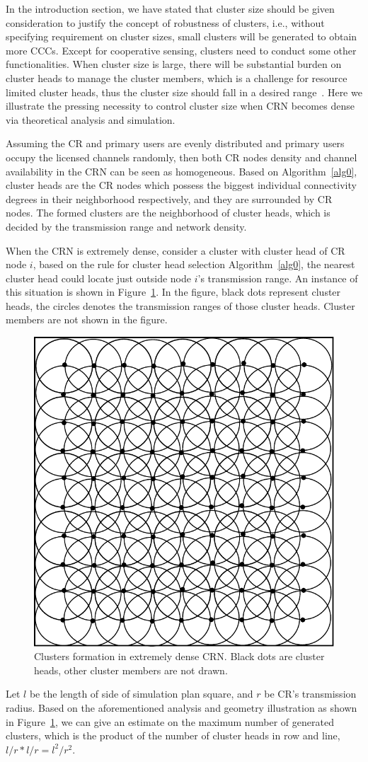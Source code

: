 \documentclass[10pt,journal,compsoc]{IEEEtran}
\theoremstyle{mytheoremstyle}
\theoremstyle{mytheoremstyle}
\theoremstyle{mytheoremstyle}
\newcommand{\ie}{i.e., }
\begin{document}
In the introduction section, we have stated that cluster size should be given consideration to justify the concept of robustness of clusters, \ie without specifying requirement on cluster sizes, small clusters will be generated to obtain more CCCs.
Except for cooperative sensing, clusters need to conduct some other functionalities.
When cluster size is large, there will be substantial burden on cluster heads to manage the cluster members, which is a challenge for resource limited cluster heads, thus the cluster size should fall in a desired range~\cite{Chen04clusteringalgorithms, capacity_cluster_06}.
Here we illustrate the pressing necessity to control cluster size when CRN becomes dense via theoretical analysis and simulation.

Assuming the CR and primary users are evenly distributed and primary users occupy the licensed channels randomly, then both CR nodes density and channel availability in the CRN can be seen as homogeneous.
Based on Algorithm~\ref{alg0}, cluster heads are the CR nodes which possess the biggest individual connectivity degrees in their neighborhood respectively, and they are surrounded by CR nodes.
The formed clusters are the neighborhood of cluster heads, which is decided by the transmission range and network density.

When the CRN is extremely dense, consider a cluster with cluster head of CR node $i$, based on the rule for cluster head selection Algorithm~\ref{alg0}, the nearest cluster head could locate just outside node $i$'s transmission range.
An instance of this situation is shown in Figure~\ref{clusters_denseNetwork}.
%
In the figure, black dots represent cluster heads, the circles denotes the transmission ranges of those cluster heads.
Cluster members are not shown in the figure.
\begin{figure}[h!]
  \centering
  \includegraphics[width=0.4\linewidth]{clusters_denseNetwork_2.pdf}
  \caption{Clusters formation in extremely dense CRN. Black dots are cluster heads, other cluster members are not drawn.}
  \label{clusters_denseNetwork}
\end{figure}
Let $l$ be the length of side of simulation plan square, and $r$ be CR's transmission radius.
Based on the aforementioned analysis and geometry illustration as shown in Figure~\ref{clusters_denseNetwork}, we can give an estimate on the maximum number of generated clusters, which is the product of the number of cluster heads in row and line, $l/r * l/r = l^2/r^2$.
\end{document}

